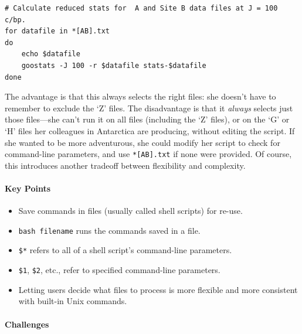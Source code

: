 \documentclass[]{book}
\begin{document}
\begin{verbatim}
# Calculate reduced stats for  A and Site B data files at J = 100 c/bp.
for datafile in *[AB].txt
do
    echo $datafile
    goostats -J 100 -r $datafile stats-$datafile
done
\end{verbatim}

The advantage is that this always selects the right files: she doesn't
have to remember to exclude the `Z' files. The disadvantage is that it
\emph{always} selects just those files---she can't run it on all files
(including the `Z' files), or on the `G' or `H' files her colleagues in
Antarctica are producing, without editing the script. If she wanted to
be more adventurous, she could modify her script to check for
command-line parameters, and use \texttt{*{[}AB{]}.txt} if none were
provided. Of course, this introduces another tradeoff between
flexibility and complexity.

\mbox{}\paragraph{Key Points}

\begin{itemize}
\item
  Save commands in files (usually called shell scripts) for re-use.
\item
  \texttt{bash filename} runs the commands saved in a file.
\item
  \texttt{\$*} refers to all of a shell script's command-line
  parameters.
\item
  \texttt{\$1}, \texttt{\$2}, etc., refer to specified command-line
  parameters.
\item
  Letting users decide what files to process is more flexible and more
  consistent with built-in Unix commands.
\end{itemize}

\mbox{}\paragraph{Challenges}
\end{document}
